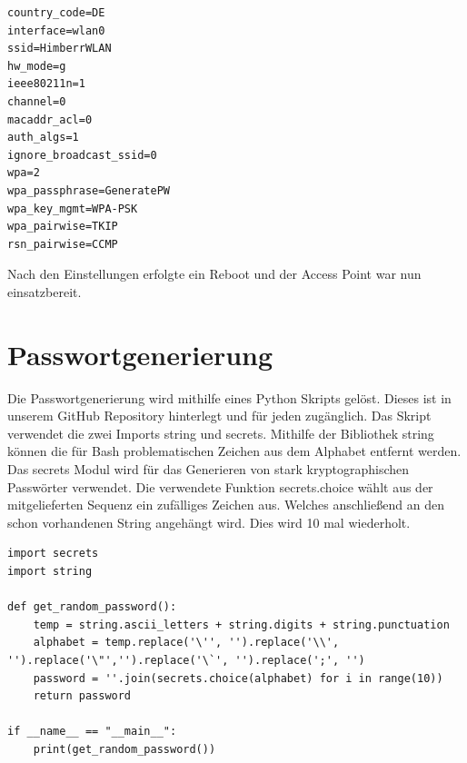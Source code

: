 \documentclass[a4paper,11pt,singlespacing]{article}
\begin{document}
                
                    \begin{lstlisting}
country_code=DE
interface=wlan0
ssid=HimberrWLAN
hw_mode=g
ieee80211n=1
channel=0
macaddr_acl=0
auth_algs=1
ignore_broadcast_ssid=0
wpa=2
wpa_passphrase=GeneratePW
wpa_key_mgmt=WPA-PSK
wpa_pairwise=TKIP
rsn_pairwise=CCMP
                    \end{lstlisting} 
                   
                   Nach den Einstellungen erfolgte ein Reboot und der Access Point war nun einsatzbereit.
                
                
            
    	\section{Passwortgenerierung}
    		Die Passwortgenerierung wird mithilfe eines Python Skripts gelöst. Dieses ist in unserem GitHub Repository hinterlegt und für jeden zugänglich. Das Skript verwendet die zwei Imports string und secrets. Mithilfe der Bibliothek string können die für Bash problematischen Zeichen aus dem Alphabet entfernt werden. Das secrets Modul wird für das Generieren von stark kryptographischen Passwörter verwendet. Die verwendete Funktion secrets.choice wählt aus der mitgelieferten Sequenz ein zufälliges Zeichen aus. Welches anschließend an den schon vorhandenen String angehängt wird. Dies wird 10 mal wiederholt.
    	
    	

            \begin{lstlisting}
import secrets
import string

def get_random_password():
	temp = string.ascii_letters + string.digits + string.punctuation
	alphabet = temp.replace('\'', '').replace('\\', '').replace('\"','').replace('\`', '').replace(';', '')
	password = ''.join(secrets.choice(alphabet) for i in range(10))
	return password

if __name__ == "__main__":
	print(get_random_password())
            \end{lstlisting}
    	
\end{document}
